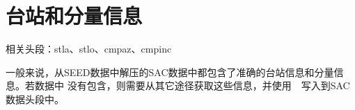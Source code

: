 \section{台站和分量信息}
相关头段：stla、stlo、cmpaz、cmpinc

一般来说，从SEED数据中解压的SAC数据中都包含了准确的台站信息和分量信息。若数据中
没有包含，则需要从其它途径获取这些信息，并使用~~写入到SAC数据头段中。
